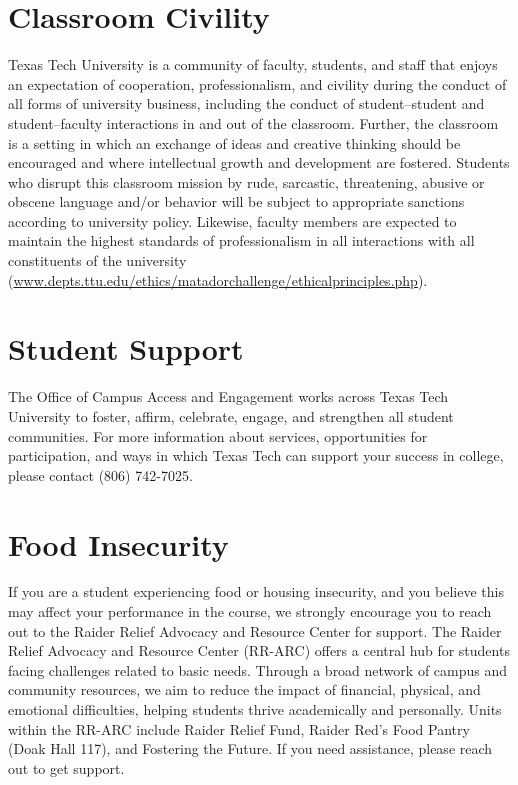 \documentclass[12pt, notitlepage]{article}   	%
\begin{document}
{\section{Classroom Civility}
Texas Tech University is a community of faculty, students, and staff that enjoys an expectation of cooperation, professionalism, and civility during the conduct of all forms of university business, including the conduct of student–student and student–faculty interactions in and out of the classroom. Further, the classroom is a setting in which an exchange of ideas and creative thinking should be encouraged and where intellectual growth and development are fostered. Students who disrupt this classroom mission by rude, sarcastic, threatening, abusive or obscene language and/or behavior will be subject to appropriate sanctions according to university policy. Likewise, faculty members are expected to maintain the highest standards of professionalism in all interactions with all constituents of the university \newline (\href{www.depts.ttu.edu/ethics/matadorchallenge/ethicalprinciples.php}{www.depts.ttu.edu/ethics/matadorchallenge/ethicalprinciples.php}).

\section{Student Support}
The Office of Campus Access and Engagement works across Texas Tech University to foster, affirm, celebrate, engage, and strengthen all student communities. For more information about services, opportunities for participation, and ways in which Texas Tech can support your success in college, please contact (806) 742-7025.

\section{Food Insecurity}
If you are a student experiencing food or housing insecurity, and you believe this may affect your performance in the course, we strongly encourage you to reach out to the Raider Relief Advocacy and Resource Center for support. The Raider Relief Advocacy and Resource Center (RR-ARC) offers a central hub for students facing challenges related to basic needs. Through a broad network of campus and community resources, we aim to reduce the impact of financial, physical, and emotional difficulties, helping students thrive academically and personally. Units within the RR-ARC include Raider Relief Fund, Raider Red's Food Pantry (Doak Hall 117), and Fostering the Future. If you need assistance, please reach out to get support.

}
\end{document}
